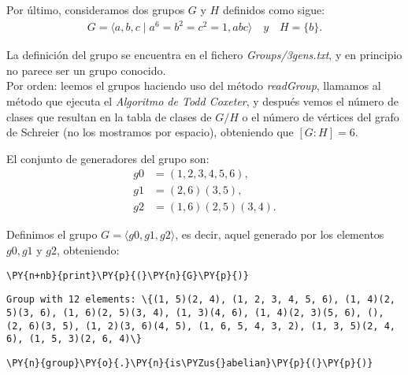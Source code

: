  
\begin{enumerate}
Por último, consideramos dos grupos $G$ y $H$ definidos como sigue:
\begin{align*}
    G = \langle a,b,c \mid a^6 = b^{2} = c^{2} = 1, abc \rangle  \quad y \quad 
H = \{ b\}.
\end{align*}

La definición del grupo se encuentra en el fichero \textit{Groups/3gens.txt}, y en principio no parece ser un grupo conocido.\\
Por orden: leemos el grupos haciendo uso del método \textit{readGroup}, llamamos al método que ejecuta el \textit{Algoritmo de Todd Coxeter}, y después vemos el número de clases que resultan en la tabla de clases de $G/H$ o el número de vértices del grafo de Schreier (no los mostramos por espacio), obteniendo que $[G:H]=6$.

El conjunto de generadores del grupo son:
\begin{align*}
    g0 &= (1, 2, 3, 4, 5, 6), \\
    g1 &= (2, 6)(3, 5), \\
    g2 &= (1, 6)(2, 5)(3, 4).
\end{align*}


Definimos el grupo $G= \langle g0, g1, g2 \rangle$, es decir, aquel generado por los elementos $g0, g1$ y $g2$, obteniendo:
    \begin{tcolorbox}[breakable, size=fbox, boxrule=1pt, pad at break*=1mm,colback=cellbackground, colframe=cellborder]
\begin{Verbatim}[commandchars=\\\{\}]
\PY{n+nb}{print}\PY{p}{(}\PY{n}{G}\PY{p}{)}
\end{Verbatim}
\end{tcolorbox}

    \begin{Verbatim}[commandchars=\\\{\}]
Group with 12 elements: \{(1, 5)(2, 4), (1, 2, 3, 4, 5, 6), (1, 4)(2, 5)(3, 6), (1, 6)(2, 5)(3, 4), (1, 3)(4, 6), (1, 4)(2, 3)(5, 6), (), (2, 6)(3, 5), (1, 2)(3, 6)(4, 5), (1, 6, 5, 4, 3, 2), (1, 3, 5)(2, 4, 6), (1, 5, 3)(2, 6, 4)\}
    \end{Verbatim}

    \begin{tcolorbox}[breakable, size=fbox, boxrule=1pt, pad at break*=1mm,colback=cellbackground, colframe=cellborder]
\begin{Verbatim}[commandchars=\\\{\}]
\PY{n}{group}\PY{o}{.}\PY{n}{is\PYZus{}abelian}\PY{p}{(}\PY{p}{)}
\end{Verbatim}
\end{tcolorbox}


\end{enumerate}
